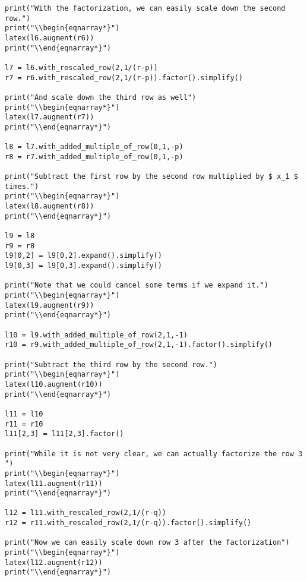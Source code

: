 \begin{verbatim}
print("With the factorization, we can easily scale down the second row.")
print("\\begin{eqnarray*}")
latex(l6.augment(r6))
print("\\end{eqnarray*}")

l7 = l6.with_rescaled_row(2,1/(r-p))
r7 = r6.with_rescaled_row(2,1/(r-p)).factor().simplify()

print("And scale down the third row as well")
print("\\begin{eqnarray*}")
latex(l7.augment(r7))
print("\\end{eqnarray*}")

l8 = l7.with_added_multiple_of_row(0,1,-p)
r8 = r7.with_added_multiple_of_row(0,1,-p)

print("Subtract the first row by the second row multiplied by $ x_1 $ times.")
print("\\begin{eqnarray*}")
latex(l8.augment(r8))
print("\\end{eqnarray*}")

l9 = l8
r9 = r8
l9[0,2] = l9[0,2].expand().simplify()
l9[0,3] = l9[0,3].expand().simplify()

print("Note that we could cancel some terms if we expand it.")
print("\\begin{eqnarray*}")
latex(l9.augment(r9))
print("\\end{eqnarray*}")

l10 = l9.with_added_multiple_of_row(2,1,-1)
r10 = r9.with_added_multiple_of_row(2,1,-1).factor().simplify()

print("Subtract the third row by the second row.")
print("\\begin{eqnarray*}")
latex(l10.augment(r10))
print("\\end{eqnarray*}")

l11 = l10
r11 = r10
l11[2,3] = l11[2,3].factor()

print("While it is not very clear, we can actually factorize the row 3 ")
print("\\begin{eqnarray*}")
latex(l11.augment(r11))
print("\\end{eqnarray*}")

l12 = l11.with_rescaled_row(2,1/(r-q))
r12 = r11.with_rescaled_row(2,1/(r-q)).factor().simplify()

print("Now we can easily scale down row 3 after the factorization")
print("\\begin{eqnarray*}")
latex(l12.augment(r12))
print("\\end{eqnarray*}")


\end{verbatim}
